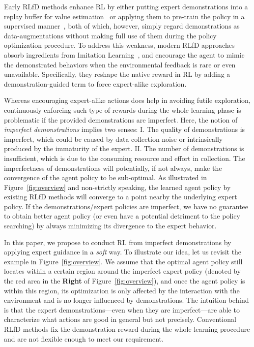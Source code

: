 \documentclass[letterpaper]{article} %
\begin{document}
Early RLfD methods enhance RL by either putting expert demonstrations into a replay buffer for value estimation~\cite{dqfd,ddpgfd} or applying them to pre-train the policy in a supervised manner~\cite{pretrain1,pretrain2}, both of which, however, simply regard demonstrations as data-augmentations without making full use of them during the policy optimization procedure. To address this weakness, modern RLfD approaches~\cite{thor,pofd} absorb ingredients from Imitation Learning~\cite{lfd1,Apprenticeship,MaxEntIRL,GAIL,pbganirl,iddm}, and encourage the agent to mimic the demonstrated behaviors when the environmental feedback is rare or even unavailable. Specifically, they reshape the native reward in RL by adding a demonstration-guided term to force expert-alike exploration. 

Whereas encouraging expert-alike actions does help in avoiding futile exploration, continuously enforcing such type of rewards during the whole learning phase is problematic if the provided demonstrations are imperfect. Here, the notion of \emph{imperfect demonstrations} implies two senses: I. The quality of demonstrations is imperfect, which could be caused by data collection noise or intrinsically produced by the immaturity of the expert. II. The number of demonstrations is insufficient, which is due to the consuming resource and effort in collection. The imperfectness of demonstrations will potentially, if not always, make the convergence of the agent policy to be sub-optimal. As illustrated in Figure~\ref{fig:overview} and non-strictly speaking, the learned agent policy by existing RLfD methods will converge to a point nearby the underlying expert policy. If the demonstrations/expert policies are imperfect, we have no guarantee to obtain better agent policy (or even have a potential detriment to the policy searching) by always minimizing its divergence to the expert behavior.    

In this paper, we propose to conduct RL from imperfect demonstrations by applying expert guidance in a \emph{soft} way. To illustrate our idea, let us revisit the example in Figure~\ref{fig:overview}. We assume that the optimal agent policy still locates within a certain region around the imperfect expert policy (denoted by the red area in the \textbf{Right} of  Figure~\ref{fig:overview}), and once the agent policy is within this region, its optimization is only affected by the interaction with the environment and is no longer influenced by demonstrations. The intuition behind is that the expert demonstrations---even when they are imperfect---are able to characterize what actions are good in general but not precisely. Conventional RLfD methods fix the demonstration reward during the whole learning procedure and are not flexible enough to meet our requirement. 
\end{document}
